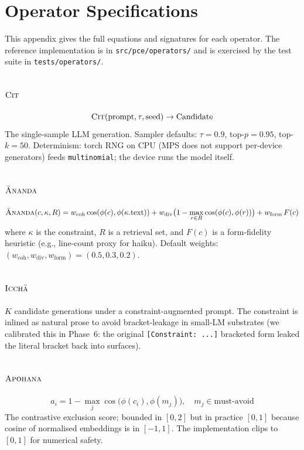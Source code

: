 \section{Operator Specifications}\label{app:operator_specs}

\sloppy

This appendix gives the full equations and signatures for each operator. The reference implementation is in \texttt{src/pce/operators/} and is exercised by the test suite in \texttt{tests/operators/}.

\subsection{$\textsc{Cit}$}
\[
\textsc{Cit}(\text{prompt}, \tau, \text{seed}) \to \text{Candidate}
\]
The single-sample LLM generation. Sampler defaults: $\tau{=}0.9$, top-$p{=}0.95$, top-$k{=}50$. Determinism: torch RNG on CPU (MPS does not support per-device generators) feeds \texttt{multinomial}; the device runs the model itself.

\subsection{$\textsc{\=Ananda}$}
\[
\textsc{\=Ananda}(c, \kappa, R) = w_{\text{coh}}\cos(\phi(c), \phi(\kappa.\text{text})) + w_{\text{div}}\bigl(1 - \max_{r\in R}\cos(\phi(c), \phi(r))\bigr) + w_{\text{form}}\,F(c)
\]
where $\kappa$ is the constraint, $R$ is a retrieval set, and $F(c)$ is a form-fidelity heuristic (e.g., line-count proxy for haiku). Default weights: $(w_{\text{coh}}, w_{\text{div}}, w_{\text{form}}) = (0.5, 0.3, 0.2)$.

\subsection{$\textsc{Icch\=a}$}
$K$ candidate generations under a constraint-augmented prompt. The constraint is inlined as natural prose to avoid bracket-leakage in small-LM substrates (we calibrated this in Phase~6: the original \texttt{[Constraint: ...]} bracketed form leaked the literal bracket back into surfaces).

\subsection{$\textsc{Apohana}$}
\[
a_i = 1 - \max_{j} \cos\bigl(\phi(c_i), \phi(m_j)\bigr), \quad m_j \in \text{must-avoid}
\]
The contrastive exclusion score; bounded in $[0, 2]$ but in practice $[0,1]$ because cosine of normalised embeddings is in $[-1, 1]$. The implementation clips to $[0, 1]$ for numerical safety.

